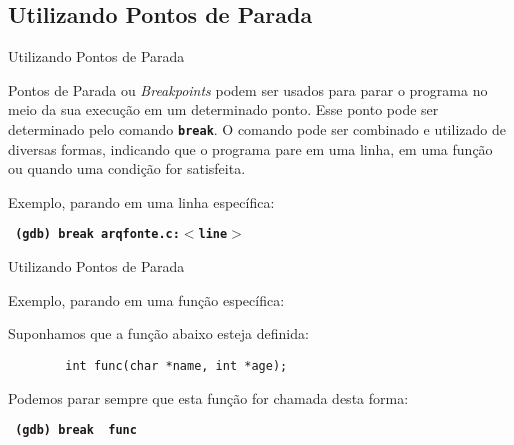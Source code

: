 \subsection{ Utilizando Pontos de Parada }
\frame{\tableofcontents[
    currentsection,
    currentsubsection,
    subsectionstyle=show/shaded/hide
]}
\begin{frame}{Utilizando Pontos de Parada}

    Pontos de Parada ou \textit{Breakpoints} podem ser usados para parar o programa no meio da sua execução em um determinado ponto. Esse ponto pode ser determinado pelo comando \texttt{\textbf{{\color{blue}break}}}. O comando pode ser combinado e utilizado de diversas formas, indicando que o programa pare em uma linha, em uma função ou quando uma condição for satisfeita.
    
    Exemplo, parando em uma linha específica:
    
    \begin{center}
        \small
        \texttt{ \textbf{ (gdb) {\color{blue}break}  {\color{black}arqfonte}{\color{red}.c}:$<${\color{dartmouthgreen}line}$>$ }}
    \end{center}
\end{frame}

\begin{frame}[fragile]{Utilizando Pontos de Parada}

    Exemplo, parando em uma função específica:
    
    Suponhamos que a função abaixo esteja definida:
    
    \begin{lstlisting}
        int func(char *name, int *age);
    \end{lstlisting}
    
    Podemos parar sempre que esta função for chamada desta forma:
    \begin{center}
        \small
        \texttt{ \textbf{ (gdb) {\color{blue}break} {\color{red} func} } }
    \end{center}
\end{frame}

